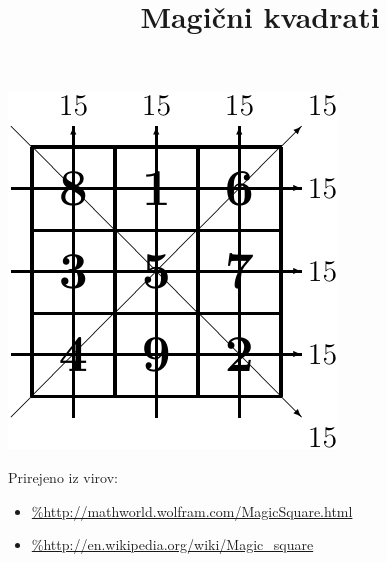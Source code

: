 \documentclass[a4paper,12pt]{article}
\title{Magični kvadrati}
\date{}
\theoremstyle{definition}
\theoremstyle{plain}
\begin{document}
\maketitle

\begin{center}
   \includegraphics{slika.pdf}
\end{center}
Prirejeno iz virov:

\begin{itemize}
   \item \url{%http://mathworld.wolfram.com/MagicSquare.html}
   \item \url{%http://en.wikipedia.org/wiki/Magic_square}
\end{itemize}

\tableofcontents

\newpage
\end{document}
